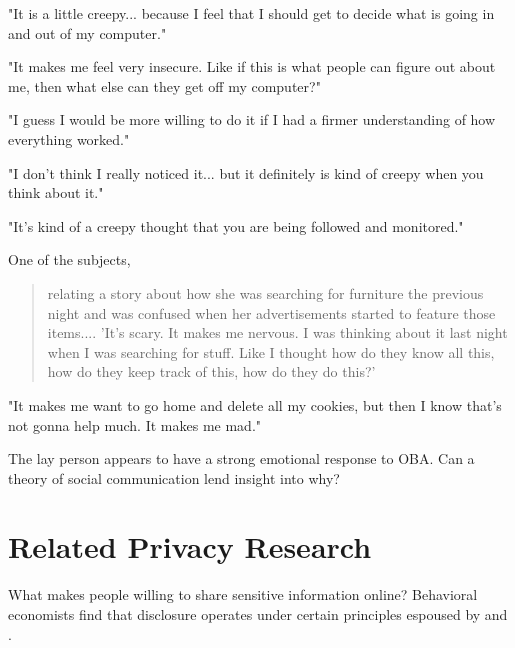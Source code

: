 \vspace{10pt}
"It is a little creepy... because I feel that I should get to decide what is going in and out of my computer." \citep[p. 6]{Ur:2012ws}

\vspace{10pt}

"It makes me feel very insecure. Like if this is what people can figure out about me, then what else can they get off my computer?" \citep[p. 6]{Ur:2012ws}

\vspace{10pt}

"I guess I would be more willing to do it if I had a firmer understanding of how everything worked." \citep[p. 7]{Ur:2012ws}

\vspace{10pt}
"I don't think I really noticed it... but it definitely is kind of creepy when you think about it." \citep[p. 7]{Ur:2012ws}

\vspace{10pt}
"It's kind of a creepy thought that you are being followed and monitored." \citep[p. 7]{Ur:2012ws}

\vspace{10pt}

One of the subjects, 
\begin{quote}
relating a story about how she was searching for furniture the previous night and was confused when her advertisements started to feature those items.... 'It's scary. It makes me nervous. I was thinking about it last night when I was searching for stuff. Like I thought how do they know all this, how do they keep track of this, how do they do this?' \citep[p. 7]{Ur:2012ws}
\end{quote}
\vspace{10pt}

"It makes me want to go home and delete all my cookies, but then I know that's not gonna help much. It makes me mad." \citep[p. 7]{Ur:2012ws}

\vspace{10pt}
The lay person appears to have a strong emotional response to OBA. Can a theory of social communication lend insight into why? 


\section{Related Privacy Research}
\label{relatedprivacyresearch}

What makes people willing to share sensitive information online? Behavioral economists  \citet*{Acquisti:2012tp}  find that disclosure operates under certain principles espoused by  \cite{Kahneman:1979wl} and \cite{Tversky:1981vc}. 

